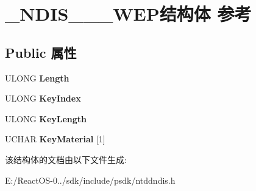 \hypertarget{struct___n_d_i_s__802__11___w_e_p}{}\section{\+\_\+\+N\+D\+I\+S\+\_\+\_\+\_\+\+W\+E\+P结构体 参考}
\label{struct___n_d_i_s__802__11___w_e_p}
\subsection*{Public 属性}
\begin{DoxyCompactItemize}
\item 
\mbox{\label{struct___n_d_i_s__802__11___w_e_p_a1fc0da9dd547d723657c84227f086747}} 
U\+L\+O\+NG {\bfseries Length}
\item 
\mbox{\label{struct___n_d_i_s__802__11___w_e_p_a58898f686c6bd82beb9e47c65eb0f8ea}} 
U\+L\+O\+NG {\bfseries Key\+Index}
\item 
\mbox{\label{struct___n_d_i_s__802__11___w_e_p_a21c8ffe4afa18950f9aec0c96af5855a}} 
U\+L\+O\+NG {\bfseries Key\+Length}
\item 
\mbox{\label{struct___n_d_i_s__802__11___w_e_p_a0722ba3a7f0525c4dfe034f6fe9f561b}} 
U\+C\+H\+AR {\bfseries Key\+Material} \mbox{[}1\mbox{]}
\end{DoxyCompactItemize}


该结构体的文档由以下文件生成\+:\begin{DoxyCompactItemize}
\item 
E\+:/\+React\+O\+S-\/0../sdk/include/psdk/ntddndis.\+h\end{DoxyCompactItemize}
